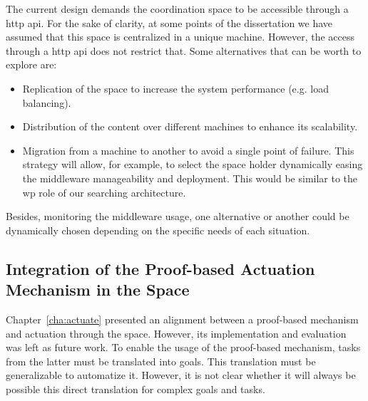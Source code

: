 The current design demands the coordination space to be accessible through a \ac{http} \ac{api}.
For the sake of clarity, at some points of the dissertation we have assumed that this space is centralized in a unique machine.
However, the access through a \ac{http} \ac{api} does not restrict that.
Some alternatives that can be worth to explore are: %
\begin{itemize}
  \item Replication of the space to increase the system performance (e.g. load balancing).
  \item Distribution of the content over different machines to enhance its scalability. %
  \item Migration from a machine to another to avoid a single point of failure.
        This strategy will allow, for example, to select the space holder dynamically easing the middleware manageability and deployment.
        This would be similar to the \ac{wp} role of our searching architecture. %
\end{itemize}

Besides, monitoring the middleware usage, one alternative or another could be dynamically chosen depending on the specific needs of each situation.


\subsection{Integration of the Proof-based Actuation Mechanism in the Space}

Chapter~\ref{cha:actuate} presented an alignment between a proof-based mechanism and actuation through the space.
However, its implementation and evaluation was left as future work.
To enable the usage of the proof-based mechanism, tasks from the latter must be translated into goals.
This translation must be generalizable to automatize it.
However, it is not clear whether it will always be possible this direct translation for complex goals and tasks.

